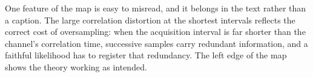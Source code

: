 One feature of the map is easy to misread, and it belongs in the text rather than a caption. The large correlation distortion at the shortest intervals reflects the correct cost of oversampling: when the acquisition interval is far shorter than the channel's correlation time, successive samples carry redundant information, and a faithful likelihood has to register that redundancy. The left edge of the map shows the theory working as intended.
